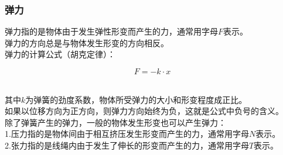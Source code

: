 \documentclass[UTF8]{ctexart}
\begin{document}
\subsubsection{弹力}
    弹力指的是物体由于发生弹性形变而产生的力，通常用字母$F$表示。\\[3mm]
    弹力的方向总是与物体发生形变的方向相反。\\[3mm]
    弹力的计算公式（胡克定律）：
    \begin{large}
        \begin{equation*}
            F=-k\cdot x
        \end{equation*}
    \end{large}\\
    其中$k$为弹簧的劲度系数，物体所受弹力的大小和形变程度成正比。\\[3mm]
    如果以位移方向为正方向，则弹力方向始终为负，这就是公式中负号的含义。\\[6mm]
    除了弹簧产生的弹力，一般的物体发生形变也可以产生弹力：\\[3mm]
    1.压力指的是物体间由于相互挤压发生形变而产生的力，通常用字母$N$表示。\\[3mm]
    2.张力指的是线绳内由于发生了伸长的形变而产生的力，通常用字母$T$表示。\\[3mm]

\newpage
\end{document}
